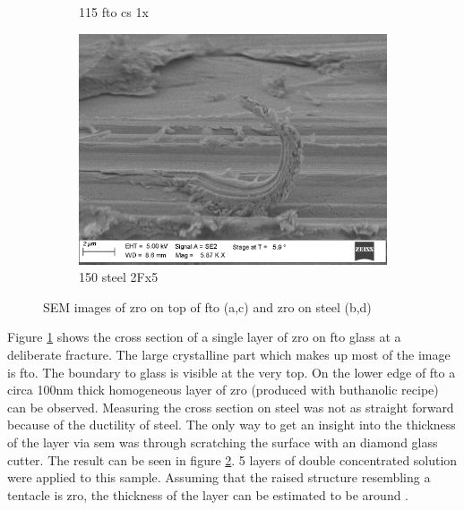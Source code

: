 \begin{figure}[htb]
\begin{subfigure}{.45\textwidth}
        \caption{115 fto cs 1x} \label{fig:sem-cs1}
    \end{subfigure}
    \begin{subfigure}{.45\textwidth}
        \centering
        \includegraphics[width=.8\textwidth]{Pics/sem/150_steel_cs_2Fx5.png}
        \caption{150 steel 2Fx5} \label{fig:sem-cs2}
    \end{subfigure}
    \caption{SEM images of \gls{zro} on top of \gls{fto} (a,c) and \gls{zro} on steel (b,d)} \label{fig:sem}
\end{figure}


Figure \ref{fig:sem-cs1} shows the cross section of a single layer of \gls{zro} on \gls{fto} glass at a deliberate fracture.
The large crystalline part which makes up most of the image is \gls{fto}. 
The boundary to glass is visible at the very top. 
On the lower edge of \gls{fto} a circa 100nm thick homogeneous layer of \gls{zro} (produced with buthanolic recipe)  can be observed.
%
Measuring the cross section on steel was not as straight forward because of the ductility of steel. 
The only way to get an insight into the thickness of the layer via \gls{sem} was through 
scratching the surface with an diamond glass cutter. 
The result can be seen in figure \ref{fig:sem-cs2}. 
5 layers of double concentrated solution were applied to this sample. 
Assuming that the raised structure resembling a tentacle is \gls{zro}, 
the thickness of the layer can be estimated to be around .

